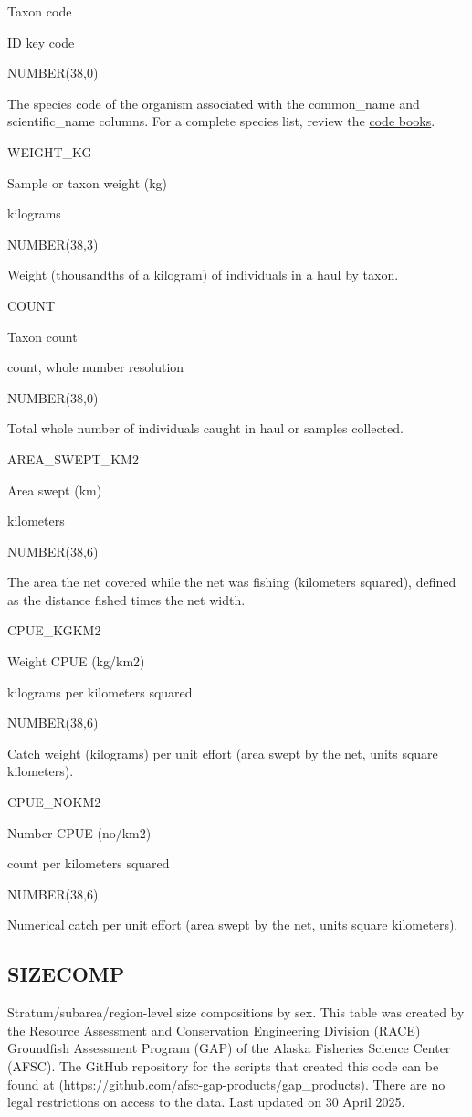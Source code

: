 \documentclass[
  letterpaper,
  oneside,
  open=any]{scrbook}
\begin{document}
Taxon code

ID key code

NUMBER(38,0)

The species code of the organism associated with the common\_name and
scientific\_name columns. For a complete species list, review the
\href{https://www.fisheries.noaa.gov/resource/document/groundfish-survey-species-code-manual-and-data-codes-manual}{code
books}.

WEIGHT\_KG

Sample or taxon weight (kg)

kilograms

NUMBER(38,3)

Weight (thousandths of a kilogram) of individuals in a haul by taxon.

COUNT

Taxon count

count, whole number resolution

NUMBER(38,0)

Total whole number of individuals caught in haul or samples collected.

AREA\_SWEPT\_KM2

Area swept (km)

kilometers

NUMBER(38,6)

The area the net covered while the net was fishing (kilometers squared),
defined as the distance fished times the net width.

CPUE\_KGKM2

Weight CPUE (kg/km2)

kilograms per kilometers squared

NUMBER(38,6)

Catch weight (kilograms) per unit effort (area swept by the net, units
square kilometers).

CPUE\_NOKM2

Number CPUE (no/km2)

count per kilometers squared

NUMBER(38,6)

Numerical catch per unit effort (area swept by the net, units square
kilometers).

\subsection{SIZECOMP}\label{sizecomp}

Stratum/subarea/region-level size compositions by sex. This table was
created by the Resource Assessment and Conservation Engineering Division
(RACE) Groundfish Assessment Program (GAP) of the Alaska Fisheries
Science Center (AFSC). The GitHub repository for the scripts that
created this code can be found at
(https://github.com/afsc-gap-products/gap\_products). There are no legal
restrictions on access to the data. Last updated on 30 April 2025.
\end{document}
